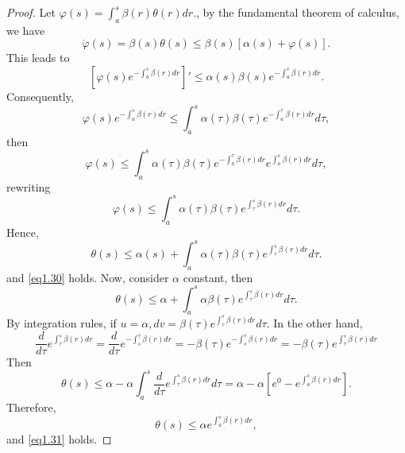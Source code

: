     \begin{proof}
        Let $\varphi(s)=\int_{a}^{s}\beta(r)\theta(r)dr.$, by the fundamental theorem 
        of calculus, we have
        $$
            \dot{\varphi}(s)=\beta(s)\theta(s)\leq \beta(s)[\alpha(s)+\varphi(s)].
        $$
        This leads to 
        $$
            [\varphi(s)e^{-\int_{a}^{s}\beta(r)dr}]'\leq\alpha(s)\beta(s) %
            e^{-\int_{a}^{s}\beta(r)dr}.
        $$
        Consequently,
        $$
            \varphi(s)e^{-\int_{a}^{s}\beta(r)dr}\leq\int_{a}^{s}\alpha(\tau)%
            \beta(\tau) e^{-\int_{a}^{\tau}\beta(r)dr}d\tau,
        $$
        then
        $$
            \varphi(s)\leq \int_{a}^{s}\alpha(\tau)\beta(\tau)%
            e^{-\int_{a}^{\tau}\beta(r)dr}e^{\int_{a}^{s}\beta(r)dr}d\tau,
        $$
        rewriting 
        $$
            \varphi(s)\leq \int_{a}^{s}\alpha(\tau)\beta(\tau)%
            e^{\int_{\tau}^{s}\beta(r)dr}d\tau .
        $$
        Hence,
        $$
            \theta(s)\leq \alpha(s)+\int_{a}^{s}\alpha(\tau)\beta(\tau)%
            e^{\int_{\tau}^{s}\beta(r)dr}d\tau.
        $$
        and \cref{eq1.30} holds. Now, consider $\alpha$ constant, then
        $$
            \theta(s)\leq \alpha+\int_{a}^{s}\alpha\beta(\tau)%
            e^{\int_{\tau}^{s}\beta(r)dr}d\tau.
        $$
        By integration rules, if $u=\alpha,dv=\beta(\tau)%
        e^{\int_{\tau}^{s}\beta(r)dr}d\tau$. In the other hand,
        $$
            \frac{d}{d\tau}e^{\int_{\tau}^{s}\beta(r)dr} = %
            \frac{d}{d\tau}e^{-\int_{s}^{\tau}\beta(r)dr} = -\beta(\tau) %
            e^{-\int_{s}^{\tau} \beta(r)dr} = -\beta(\tau)e^{\int_{\tau}^{s}\beta(r)dr}
        $$
        Then
        $$
            \theta(s)\leq\alpha-\alpha\int_{a}^{s}\frac{d}{d\tau}%
            e^{\int_{\tau}^{s}\beta(r)dr}d\tau = \alpha-\alpha [e^{0} -
            e^{\int_{a}^{s}\beta(r)dr}].
        $$
        Therefore,
        $$
            \theta(s)\leq \alpha e^{\int_{a}^{s}\beta(r)dr},
        $$
        and \cref{eq1.31} holds.
    \end{proof}
